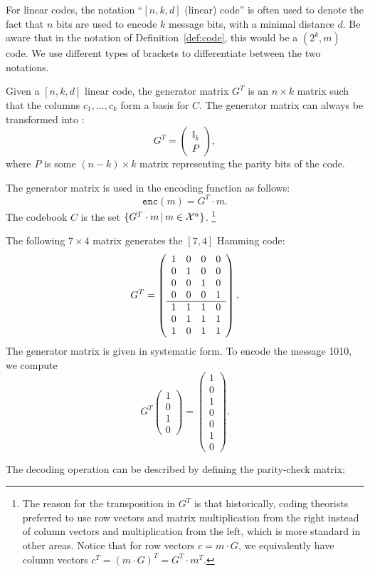 For linear codes, the notation ``$[n,k,d]$ (linear) code'' is often used to denote the fact that $n$ bits are used to encode $k$ message bits, with a minimal distance $d$. Be aware that in the notation of Definition~\ref{def:code}, this would be a $(2^k, m)$ code. We use different types of brackets to differentiate between the two notations.

\begin{definition}
Given a $[n,k,d]$ linear code, the generator matrix $G^T$ is an $n \times k$ matrix such that the columns $c_1, ..., c_k$ form a basis for $C$. The generator matrix can always be transformed into :
\[
G^T = 
\left(
\begin{array}{c}
\mathbb{I}_k\\
\hline
P
\end{array}
\right),
\]
where $P$ is some $(n-k) \times k$ matrix representing the parity bits of the code.
\end{definition}
The generator matrix is used in the encoding function as follows:
\[
\mathtt{enc}(m) = G^T \cdot m.
\]
The codebook $C$ is the set $\{G^T \cdot m\,|\,m \in \mathcal{X}^n\}$.
\footnote{The reason for the transposition in $G^T$ is that historically, coding theorists preferred to use row vectors and matrix multiplication from the right instead of column vectors and multiplication from the left, which is more standard in other areas. Notice that for row vectors $c = m \cdot G$, we equivalently have column vectors $c^T = (m \cdot G)^T = G^T \cdot m^T$.}

\begin{example}
The following $7 \times 4$ matrix generates the $[7,4]$ Hamming code:
\[
G^T = 
\left(
\begin{array}{c c c c}
1 & 0 & 0 & 0\\
0 & 1 & 0 & 0\\
0 & 0 & 1 & 0\\
0 & 0 & 0 & 1\\
\hline
1 & 1 & 1 & 0\\
0 & 1 & 1 & 1\\
1 & 0 & 1 & 1
\end{array}
\right).
\]
The generator matrix is given in systematic form. To encode the message 1010, we compute
\[
G^T \left(\begin{array}{c}
1\\0\\1\\0
\end{array}\right) = \left(\begin{array}{c}
1\\0\\1\\0\\0\\1\\0
\end{array}\right).
\]
\end{example}
The decoding operation can be described by defining the parity-check matrix:

